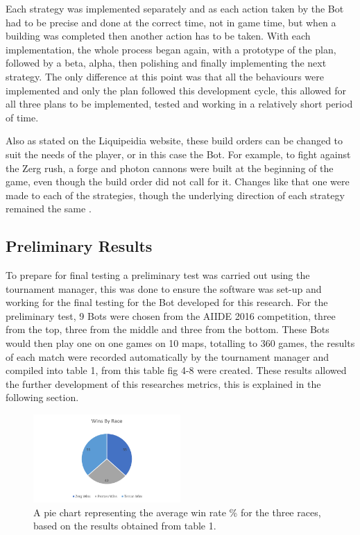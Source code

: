\documentclass[journal]{IEEEtran}
\begin{document}
	Each strategy was implemented separately and as each action taken by the Bot had to be precise and done at the correct time, not in game time, but when a building was completed then another action has to be taken. With each implementation, the whole process began again, with a prototype of the plan, followed by a beta, alpha, then polishing and finally implementing the next strategy. The only difference at this point was that all the behaviours were implemented and only the plan followed this development cycle, this allowed for all three plans to be implemented, tested and working in a relatively short period of time.
	
	Also as stated on the Liquipeidia website, these build orders can be changed to suit the needs of the player, or in this case the Bot. For example, to fight against the Zerg rush, a forge and photon cannons were built at the beginning of the game, even though the build order did not call for it. Changes like that one were made to each of the strategies, though the underlying direction of each strategy remained the same \cite{Alter}.
	
	\subsection{Preliminary Results}
	To prepare for final testing a preliminary test was carried out using the tournament manager, this was done to ensure the software was set-up and working for the final testing for the Bot developed for this research. For the preliminary test, 9 Bots were chosen from the AIIDE 2016 competition, three from the top, three from the middle and three from the bottom. These Bots would then play one on one games on 10 maps, totalling to 360 games, the results of each match were recorded automatically by the tournament manager and compiled into table 1, from this table fig 4-8 were created. These results allowed the further development of this researches metrics, this is explained in the following section.
	
	\begin{figure}[H]
		\centering
		\includegraphics[width=0.5\textwidth]{RacePie}
		\caption{A pie chart representing the average win rate \% for the three races, based on the results obtained from table 1.}
		\label{Fig4}
	\end{figure}
\end{document}
